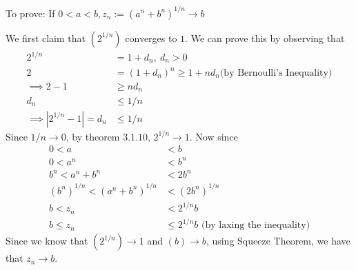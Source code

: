 \documentclass[boxes, qed]{homework}
\begin{document}
\newenvironment{amatrix}[1]{%
  \left[\begin{array}{@{}*{#1}{c}|c@{}}
}{%
  \end{array}\right]
}

\newenvironment{augmatrix}[1]{%
  \left[\begin{array}{#1}
}{%
  \end{array}\right]
}
\begin{problem}To prove: If $0<a<b, z_n := (a^n+b^n)^{1/n} \rightarrow b$
\end{problem}
\begin{solution}We first claim that $(2^{1/n})$ converges to $1$.
  We can prove this by observing that
  \begin{align*}
    2^{1/n}&=1+d_n,\ d_n>0\\
    2&=(1+d_n)^n \ge 1+nd_n
    \text{(by Bernoulli's Inequality)}\\
    \implies 2-1&\ge nd_n\\
    d_n&\le{1/n}\\
    \implies |2^{1/n}-1|=d_n&\le{1/n}
  \end{align*}
  Since $1/n\rightarrow{0}$, by theorem $3.1.10$,
  $2^{1/n}\rightarrow{1}$. Now since
  \begin{align*}
    0 < a &< b\\
    0 < a^n &< b^n\\
    b^n < a^n+b^n &< 2b^n\\
    (b^n)^{1/n} < (a^n+b^n)^{1/n} &< (2b^n)^{1/n}\\
    b < z_n &< 2^{1/n}b\\
    b \le z_n &\le 2^{1/n}b
    \text{ (by laxing the inequality)}
  \end{align*}
  Since we know that $(2^{1/n}) \rightarrow 1$ 
  and $(b) \rightarrow b$, using Squeeze Theorem,
  we have that $z_n \rightarrow b$.
\end{solution}
\end{document}
